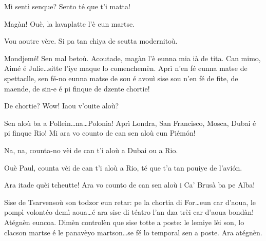 \begin{drama}
\Paganspeaks Mi sentì senque? Sento té que t'i matta!

\Nevaousaspeaks Magàn! Ouè, la lavaplatte l'è eun martse.

\Maganspeaks Vou aoutre vère. Si pa tan chiya de seutta modernitoù.


\Paganspeaks Mondjemé! Sen mal betoù.  Acoutade, magàn l'è eun\-na mia ià de tita. Can mimo, Aimé é Julie\ldots sitte l'iye maque lo comenchemèn. Aprì n'en fé eunna matse de spettaclle, sen fé-no eunna matse de sou é avouì sise sou n'en fé de fite, de maende, de sin-e é pi finque de dzente chortie!

\Nevaousaspeaks De chortie? Wow! Iaou v'ouite aloù?

\Paganspeaks Sen aloù ba a Pollein\ldots na\ldots Polonia! Aprì Londra, San Francisco,  Mosca, Dubai é pi finque Rio! Mi ara vo counto de can sen aloù eun Piém\'on!

\Nevaouspeaks Na, na, counta-no vèi de can t'i aloù a Dubai ou a Rio.

 
\Maganspeaks Ouè Paul, counta vèi de can t'i aloù a Rio, té que t'a tan pouiye de l’avi\'on.

\Paganspeaks{} Ara itade quèi tcheutte! Ara vo counto de can sen aloù i Ca' Brusà ba pe Alba! 



\newpage
{}



\Chauffeurspeaks Sise de Tsarvensoù son todzor eun retar: pe la chortia di For\ldots eun car d'aoua, le pompì volontéo demì aoua\ldots é ara sise di téatro l'an dza trèi car d'aoua bondàn! Atégnèn euncoa. Dimèn controlèn que sise totte a poste: le lemiye lèi son, lo clacson martse é le panavèyo martson\ldots se fé lo temporal sen a poste. Ara atégnèn.



\end{drama}
